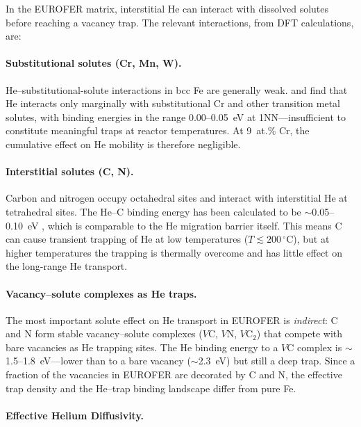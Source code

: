 \documentclass[pdflatex,sn-basic]{sn-jnl} %
\begin{document}
In the EUROFER matrix, interstitial He can interact with dissolved solutes
before reaching a vacancy trap. The relevant interactions, from DFT
calculations, are:

\paragraph{Substitutional solutes (Cr, Mn, W).}
He--substitutional-solute interactions in bcc Fe are generally weak.
\cite{Becquart2007} and \cite{Seletskaia2005} find that He interacts only
marginally with substitutional Cr and other transition metal solutes, with
binding energies in the range 0.00--0.05~eV at 1NN---insufficient to
constitute meaningful traps at reactor temperatures. At 9~at.\% Cr, the
cumulative effect on He mobility is therefore negligible.

\paragraph{Interstitial solutes (C, N).}
Carbon and nitrogen occupy octahedral sites and interact with interstitial
He at tetrahedral sites. The He--C binding energy has been calculated to be
$\sim$0.05--0.10~eV \citep{Becquart2007,Gao2011_He}, which is comparable to
the He migration barrier itself. This means C can cause transient trapping
of He at low temperatures ($T \lesssim 200\,^\circ$C), but at higher
temperatures the trapping is thermally overcome and has little effect on
the long-range He transport.

\paragraph{Vacancy--solute complexes as He traps.}
The most important solute effect on He transport in EUROFER is
\emph{indirect}: C and N form stable vacancy--solute complexes ($V$C, $V$N,
$V$C$_2$) that compete with bare vacancies as He trapping sites. The He
binding energy to a $V$C complex is $\sim$1.5--1.8~eV---lower than to a bare
vacancy ($\sim$2.3~eV) but still a deep trap. Since a fraction of the
vacancies in EUROFER are decorated by C and N, the effective trap density
and the He--trap binding landscape differ from pure Fe.

\paragraph{Effective Helium Diffusivity.}
\end{document}
